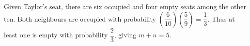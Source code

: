 Given Taylor's seat, there are six occupied and four empty seats among the other ten. Both neighbours are occupied with probability $(\dfrac{6}{10})(\dfrac{5}{9})=\dfrac{1}{3}$. Thus at least one is empty with probability $\dfrac{2}{3}$, giving $m+n=\boxed5$.
